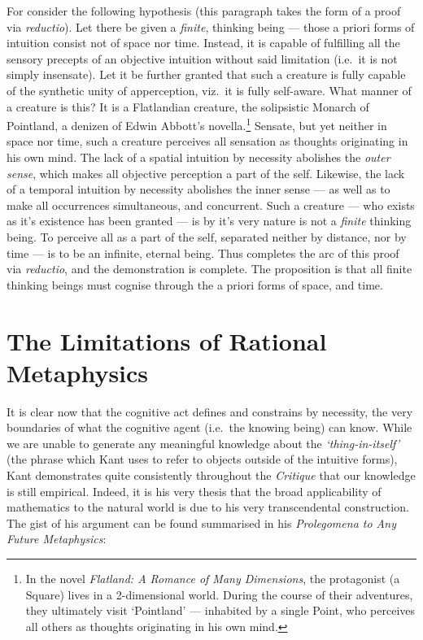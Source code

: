 \noindent
For consider the following hypothesis (this paragraph takes the form of a proof via \emph{reductio}). Let there be given a \emph{finite}, thinking being --- those a priori forms of intuition consist not of space nor time. Instead, it is capable of fulfilling all the sensory precepts of an objective intuition without said limitation (i.e.\ it is not simply insensate). Let it be further granted that such a creature is fully capable of the synthetic unity of apperception, viz.\ it is fully self-aware. What manner of a creature is this? It is a Flatlandian creature, the solipsistic Monarch of Pointland, a denizen of Edwin Abbott's novella.\footnote{In the novel \emph{Flatland: A Romance of Many Dimensions}, the protagonist (a Square) lives in a 2-dimensional world. During the course of their adventures, they ultimately visit \enquote*{Pointland} --- inhabited by a single Point, who perceives all others as thoughts originating in his own mind.} Sensate, but yet neither in space nor time, such a creature perceives all sensation as thoughts originating in his own mind. The lack of a spatial intuition by necessity abolishes the \emph{outer sense}, which makes all objective perception a part of the self. Likewise, the lack of a temporal intuition by necessity abolishes the inner sense --- as well as to make all occurrences simultaneous, and concurrent. Such a creature --- who exists as it's existence has been granted --- is by it's very nature is not a \emph{finite} thinking being. To perceive all as a part of the self, separated neither by distance, nor by time --- is to be an infinite, eternal being. Thus completes the arc of this proof via \emph{reductio}, and the demonstration is complete. The proposition is that all finite thinking beings must cognise through the a priori forms of space, and time.

\section{The Limitations of Rational Metaphysics}
It is clear now that the cognitive act defines and constrains by necessity, the very boundaries of what the cognitive agent (i.e.\ the knowing being) can know. While we are unable to generate any meaningful knowledge about the \emph{\enquote*{thing-in-itself}} (the phrase which Kant uses to refer to objects outside of the intuitive forms), Kant demonstrates quite consistently throughout the \emph{Critique} that our knowledge is still empirical. Indeed, it is his very thesis that the broad applicability of mathematics to the natural world is due to his very transcendental construction. The gist of his argument can be found summarised in his \emph{Prolegomena to Any Future Metaphysics}:

